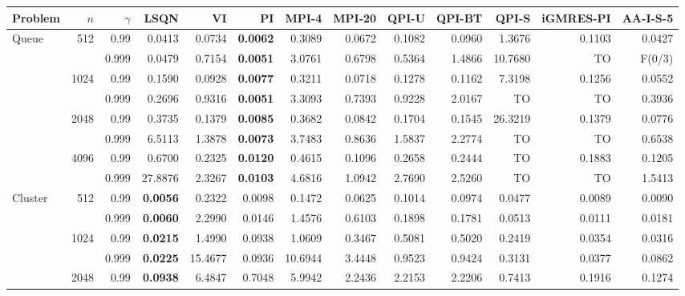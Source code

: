 \begin{landscape}
\begin{table}[p]
\centering
\begingroup
\fontsize{8}{9}\selectfont
\setlength{\tabcolsep}{3.8pt}
\renewcommand{\arraystretch}{1.08}
\begin{tabular}{@{}lrr*{10}{r}@{}}
\toprule
Problem & $n$ & $\gamma$ & \textbf{LSQN} & VI & PI & MPI-4 & MPI-20 & QPI-U & QPI-BT & QPI-S & iGMRES-PI & AA-I-S-5 \\
\midrule
Queue & 512 & 0.99 & 0.0413 & 0.0734 & \textbf{0.0062} & 0.3089 & 0.0672 & 0.1082 & 0.0960 & 1.3676 & 0.1103 & 0.0427 \\
 &  & 0.999 & 0.0479 & 0.7154 & \textbf{0.0051} & 3.0761 & 0.6798 & 0.5364 & 1.4866 & 10.7680 & TO & F(0/3) \\
 & 1024 & 0.99 & 0.1590 & 0.0928 & \textbf{0.0077} & 0.3211 & 0.0718 & 0.1278 & 0.1162 & 7.3198 & 0.1256 & 0.0552 \\
 &  & 0.999 & 0.2696 & 0.9316 & \textbf{0.0051} & 3.3093 & 0.7393 & 0.9228 & 2.0167 & TO & TO & 0.3936 \\
 & 2048 & 0.99 & 0.3735 & 0.1379 & \textbf{0.0085} & 0.3682 & 0.0842 & 0.1704 & 0.1545 & 26.3219 & 0.1379 & 0.0776 \\
 &  & 0.999 & 6.5113 & 1.3878 & \textbf{0.0073} & 3.7483 & 0.8636 & 1.5837 & 2.2774 & TO & TO & 0.6538 \\
 & 4096 & 0.99 & 0.6700 & 0.2325 & \textbf{0.0120} & 0.4615 & 0.1096 & 0.2658 & 0.2444 & TO & 0.1883 & 0.1205 \\
 &  & 0.999 & 27.8876 & 2.3267 & \textbf{0.0103} & 4.6816 & 1.0942 & 2.7690 & 2.5260 & TO & TO & 1.5413 \\
\midrule
Cluster & 512 & 0.99 & \textbf{0.0056} & 0.2322 & 0.0098 & 0.1472 & 0.0625 & 0.1014 & 0.0974 & 0.0477 & 0.0089 & 0.0090 \\
 &  & 0.999 & \textbf{0.0060} & 2.2990 & 0.0146 & 1.4576 & 0.6103 & 0.1898 & 0.1781 & 0.0513 & 0.0111 & 0.0181 \\
 & 1024 & 0.99 & \textbf{0.0215} & 1.4990 & 0.0938 & 1.0609 & 0.3467 & 0.5081 & 0.5020 & 0.2419 & 0.0354 & 0.0316 \\
 &  & 0.999 & \textbf{0.0225} & 15.4677 & 0.0936 & 10.6944 & 3.4448 & 0.9523 & 0.9424 & 0.3131 & 0.0377 & 0.0862 \\
 & 2048 & 0.99 & \textbf{0.0938} & 6.4847 & 0.7048 & 5.9942 & 2.2436 & 2.2153 & 2.2206 & 0.7413 & 0.1916 & 0.1274 \\

\end{tabular}
\end{table}
\end{landscape}
